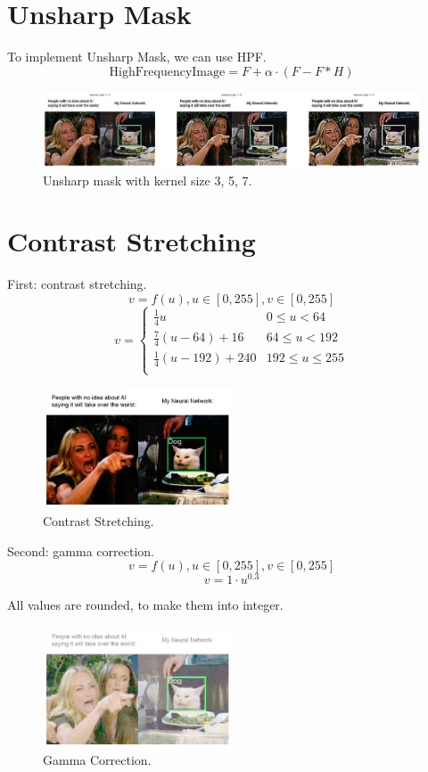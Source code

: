 \documentclass{article}
\begin{document}
\section{Unsharp Mask}
To implement Unsharp Mask, we can use HPF.
$$\text{HighFrequencyImage} = F + \alpha\cdot(F - F*H)$$
\begin{figure}[!h]
    \centering
    \includegraphics[width=\textwidth]{fig/unsharp_mask.png}
    \caption{Unsharp mask with kernel size 3, 5, 7.}
\end{figure}

\newpage
\section{Contrast Stretching}
First: contrast stretching.
$$v=f(u), u\in[0, 255], v\in[0,255]$$
$$
v = \begin{cases}
    \frac{1}{4}u & 0\leq u < 64 \\
    \frac{7}{4}(u-64)+16 & 64\leq u < 192 \\
    \frac{1}{4}(u-192)+240 & 192\leq u\leq 255 \\
\end{cases}
$$

\begin{figure}[!ht]
    \centering
    \includegraphics[width=0.5\textwidth]{fig/contrast_stretch.png}
    \caption{Contrast Stretching.}
\end{figure}

Second: gamma correction.
$$v=f(u), u\in[0, 255], v\in[0,255]$$
$$v=1\cdot u^{0.3}$$  

All values are rounded, to make them into integer.
\begin{figure}[!ht]
    \centering
    \includegraphics[width=0.5\textwidth]{fig/gamma_corr.png}
    \caption{Gamma Correction.}
\end{figure}
\end{document}
